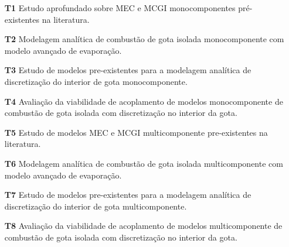 \begin{itemize}
    \item[\textbf{T1}] Estudo aprofundado sobre MEC e MCGI monocomponentes pré-existentes na literatura.%
    \item[\textbf{T2}] Modelagem analítica de combustão de gota isolada monocomponente com modelo avançado de evaporação.%
    \item[\textbf{T3}] Estudo de modelos pre-existentes para a modelagem  analítica de discretização do interior de gota monocomponente.%
    \item[\textbf{T4}] Avaliação da viabilidade de acoplamento de modelos monocomponente de combustão de gota isolada com discretização no interior da gota.%

    \item[\textbf{T5}] Estudo de modelos MEC e MCGI multicomponente pre-existentes na literatura.%
    \item[\textbf{T6}]  Modelagem analítica de combustão de gota isolada multicomponente com modelo avançado de evaporação.%
    \item[\textbf{T7}] Estudo de modelos pre-existentes para a modelagem analítica de discretização do interior de gota multicomponente.%
    \item[\textbf{T8}] Avaliação da viabilidade de acoplamento de modelos multicomponente de combustão de gota isolada com discretização no interior da gota. 
    

\end{itemize}
